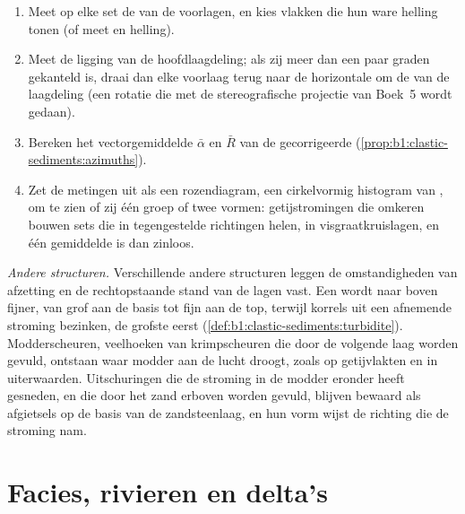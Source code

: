 \begin{method}\label{met:b1:clastic-sediments:palaeocurrent}
\begin{enumerate}
  \item Meet op elke set de  van de voorlagen, en kies vlakken die hun ware helling tonen (of meet  en helling).
  \item Meet de ligging van de hoofdlaagdeling; als zij meer dan een paar graden gekanteld is, draai dan elke voorlaag terug naar de horizontale om de  van de laagdeling (een rotatie die met de stereografische projectie van Boek~5 wordt gedaan).
  \item Bereken het vectorgemiddelde $\bar\alpha$ en $\bar R$ van de gecorrigeerde  (\cref{prop:b1:clastic-sediments:azimuths}).
  \item Zet de metingen uit als een rozendiagram, een cirkelvormig histogram van , om te zien of zij één groep of twee vormen: getijstromingen die omkeren bouwen sets die in tegengestelde richtingen helen, in visgraatkruislagen, en één gemiddelde is dan zinloos.
\end{enumerate}
\end{method}

\emph{Andere structuren.} Verschillende andere structuren leggen de omstandigheden van afzetting en de rechtopstaande stand van de lagen vast. Een  wordt naar boven fijner, van grof aan de basis tot fijn aan de top, terwijl korrels uit een afnemende stroming bezinken, de grofste eerst (\cref{def:b1:clastic-sediments:turbidite}). Modderscheuren, veelhoeken van krimpscheuren die door de volgende laag worden gevuld, ontstaan waar modder aan de lucht droogt, zoals op getijvlakten en in uiterwaarden. Uitschuringen die de stroming in de modder eronder heeft gesneden, en die door het zand erboven worden gevuld, blijven bewaard als afgietsels op de basis van de zandsteenlaag, en hun vorm wijst de richting die de stroming nam.

\section{Facies, rivieren en delta's}\label{sec:b1:clastic-sediments:rivers-deltas}

